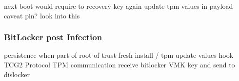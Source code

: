 next boot would require to recovery key again
update tpm values in payload
\cite{microsoft-bitlocker-manage-bde}
caveat pin? look into this


\subsubsection{BitLocker post Infection}
persistence when part of root of trust
fresh install / tpm update values
hook \ac{TCG2} Protocol \cite[6.7.3]{tcg-efi-protocol-spec}
\ac{TPM} communication
receive bitlocker \ac{VMK} key and send to dislocker
\cite{bde-format-spec}
\cite{tpm-sniffing}


